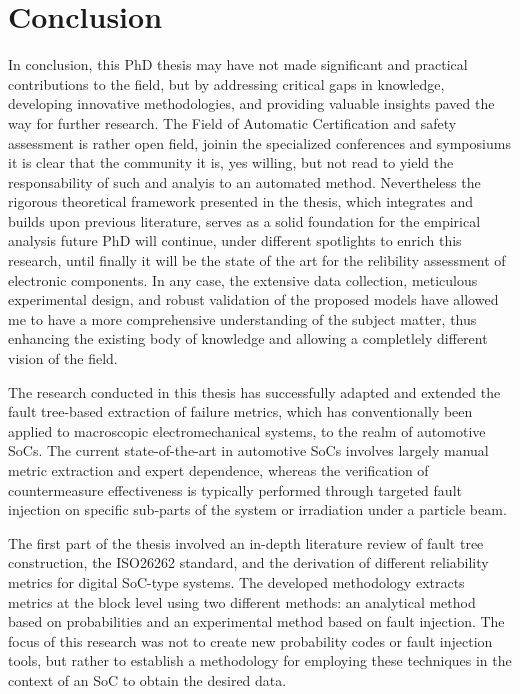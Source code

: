 \documentclass[./dissertation.tex]{subfiles}
\begin{document}
    \chapter{Conclusion}
In conclusion, this PhD thesis may have not made significant and practical contributions to the field, but by addressing critical gaps in knowledge, developing innovative methodologies, and providing valuable insights paved the way for further research. The Field of Automatic Certification and safety assessment is rather open field, joinin the specialized conferences and symposiums it is clear that the community it is, yes willing, but not read to yield the responsability of such and analyis to an automated method. Nevertheless the rigorous theoretical framework presented in the thesis, which integrates and builds upon previous literature, serves as a solid foundation for the empirical analysis future PhD will continue, under different spotlights to enrich this research, until finally it will be the state of the art for the relibility assessment of electronic components. In any case, the extensive data collection, meticulous experimental design, and robust validation of the proposed models have allowed me to have a more comprehensive understanding of the subject matter, thus enhancing the existing body of knowledge and allowing a completlely different vision of the field.


The research conducted in this thesis has successfully adapted and extended the fault tree-based extraction of failure metrics, which has conventionally been applied to macroscopic electromechanical systems, to the realm of automotive SoCs. The current state-of-the-art in automotive SoCs involves largely manual metric extraction and expert dependence, whereas the verification of countermeasure effectiveness is typically performed through targeted fault injection on specific sub-parts of the system or irradiation under a particle beam.

The first part of the thesis involved an in-depth literature review of fault tree construction, the ISO26262 standard, and the derivation of different reliability metrics for digital SoC-type systems. The developed methodology extracts metrics at the block level using two different methods: an analytical method based on probabilities and an experimental method based on fault injection. The focus of this research was not to create new probability codes or fault injection tools, but rather to establish a methodology for employing these techniques in the context of an SoC to obtain the desired data.
\end{document}
